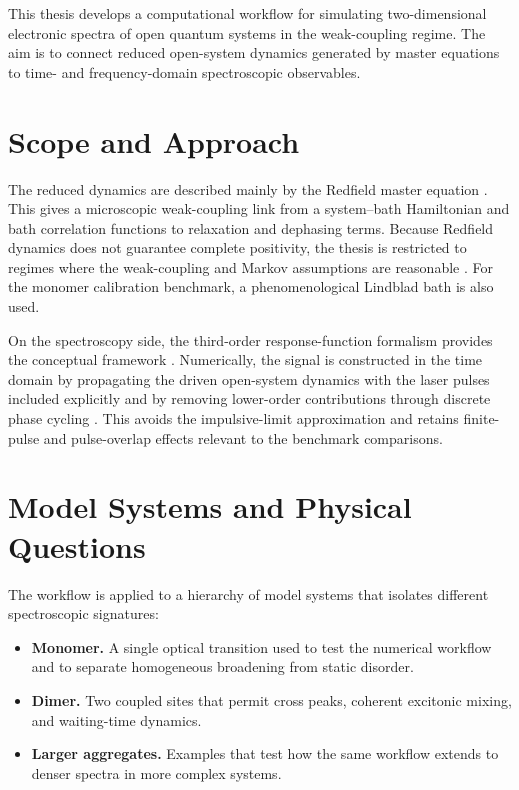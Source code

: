 This thesis develops a computational workflow for simulating
two-dimensional electronic spectra of open quantum systems in the
weak-coupling regime. The aim is to connect reduced open-system dynamics
generated by master equations to time- and frequency-domain spectroscopic
observables.

\section{Scope and Approach}
\label{sec:intro_scope}

The reduced dynamics are described mainly by the Redfield master equation
\cite{breuerpetruccione2007theoryopenquantum,
weiss2012quantumdissipativesystems}.
This gives a microscopic weak-coupling link from a system--bath
Hamiltonian and bath correlation functions to relaxation and dephasing
terms. Because Redfield dynamics does not guarantee complete positivity,
the thesis is restricted to regimes where the weak-coupling and Markov
assumptions are reasonable
\cite{breuerpetruccione2007theoryopenquantum,
rivasetal2010markovianmasterequations}. For the monomer calibration
benchmark, a phenomenological Lindblad bath is also used.

On the spectroscopy side, the third-order response-function formalism
provides the conceptual framework
\cite{mancal2022nonlinearopticalspectroscopy}. Numerically, the signal is
constructed in the time domain by propagating the driven open-system
dynamics with the laser pulses included explicitly and by removing
lower-order contributions through discrete phase cycling
\cite{segarra-martietal2018accuratesimulationtwodimensional,
sunetal2025twodimensionalspectroscopyopen}. This avoids the impulsive-limit
approximation and retains finite-pulse and pulse-overlap effects relevant
to the benchmark comparisons.

\section{Model Systems and Physical Questions}
\label{sec:intro_models_questions}

The workflow is applied to a hierarchy of model systems that isolates
different spectroscopic signatures:
\begin{itemize}
\item \textbf{Monomer.} A single optical transition used to test the
	numerical workflow and to separate homogeneous broadening from static
	disorder.
\item \textbf{Dimer.} Two coupled sites that permit cross peaks, coherent
	excitonic mixing, and waiting-time dynamics.
\item \textbf{Larger aggregates.} Examples that test how the same workflow extends
	to denser spectra in more complex systems.
\end{itemize}

